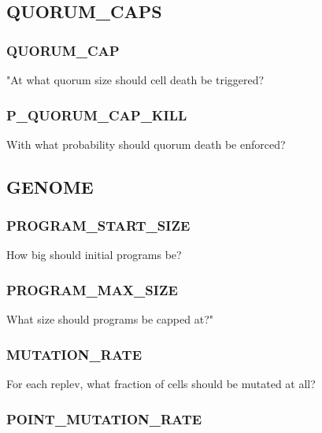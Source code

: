 \subsection{QUORUM\_CAPS}

\subsubsection{QUORUM\_CAP}


"At what quorum size should cell death be triggered?

\subsubsection{P\_QUORUM\_CAP\_KILL}


With what probability should quorum death be enforced?

\subsection{GENOME}

\subsubsection{PROGRAM\_START\_SIZE}


How big should initial programs be?

\subsubsection{PROGRAM\_MAX\_SIZE}


What size should programs be capped at?"

\subsubsection{MUTATION\_RATE}


For each replev, what fraction of cells should be mutated at all?

\subsubsection{POINT\_MUTATION\_RATE}

